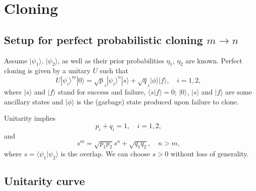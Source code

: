 \documentclass[a4]{article}
\begin{document}
\section{Cloning}

\subsection{Setup for perfect probabilistic cloning \boldmath $m\to n$}

Assume $|\psi_1\rangle$, $|\psi_2\rangle$, as well as their prior probabilities $\eta_1$, $\eta_2$ are known. Perfect cloning is given by a unitary $U$ such that
$$
U|\psi_i\rangle^m|0\rangle=\sqrt p_i |\psi_i\rangle^n|s\rangle+\sqrt q_i |\phi\rangle|f\rangle,\quad i=1,2,
$$
where $|s\rangle$ and $|f\rangle$ stand for success and failure, $\langle s| f\rangle=0$; $|0\rangle$, $|s\rangle$ and $|f\rangle$ are some ancillary states and $|\phi\rangle$ is the (garbage) state produced upon failure to clone.

Unitarity implies
$$
p_i+q_i=1,\quad i=1,2,
$$
and
$$
s^m=\sqrt{p_1p_2}s^n+\sqrt{q_1 q_2}, \quad n>m,
$$
where $s=\langle\psi_1|\psi_2\rangle$ is the overlap. We can choose $s>0$ without loss of generality.

\subsection{Unitarity curve}\label{uni cur}
\end{document}
